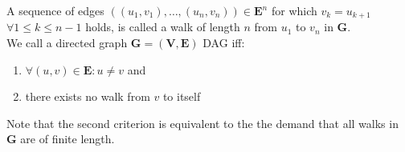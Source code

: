 A sequence of edges $((u_1,v_1),\dots,(u_n,v_n))\in \mathbf{E}^n$ for which $v_k=u_{k+1}$ $\forall 1\leq k \leq n-1$ holds, is called a walk of length $n$ from $u_1$ to $v_n$ in $\mathbf{G}$.\\

We call a directed graph $\mathbf{G}=(\mathbf{V},\mathbf{E})$ \acf{DAG} iff:
\begin{enumerate}
  \item $\forall (u,v)\in\mathbf{E} : u \neq v $ and
  \item there exists no walk from $v$ to itself
\end{enumerate}

Note that the second criterion is equivalent to the the demand that all walks in $\mathbf{G}$ are of finite length.


